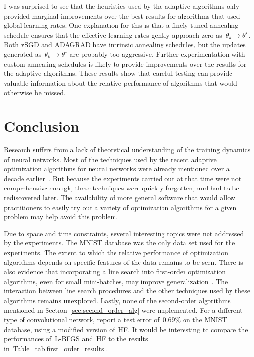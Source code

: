 \documentclass[11pt,a4paper]{article}
\numberwithin{equation}{section}
\begin{document}
I was surprised to see that the heuristics used by the adaptive algorithms only
provided marginal improvements over the best results for algorithms that used
global learning rates. One explanation for this is that a finely-tuned annealing
schedule ensures that the effective learning rates gently approach zero
as~$\theta_k \to \theta^\star$. Both vSGD and ADAGRAD have intrinsic annealing
schedules, but the updates generated as~$\theta_k \to \theta^\star$ are probably
too aggressive. Further experimentation with custom annealing schedules is
likely to provide improvements over the results for the adaptive algorithms.
These results show that careful testing can provide valuable information about
the relative performance of algorithms that would otherwise be missed.

\section{Conclusion}

Research suffers from a lack of theoretical understanding of the training
dynamics of neural networks. Most of the techniques used by the recent adaptive
optimization algorithms for neural networks were already mentioned over a decade
earlier~\citep{lecun-98b}. But because the experiments carried out at that time
were not comprehensive enough, these techniques were quickly forgotten, and had
to be rediscovered later. The availability of more general software that would
allow practitioners to easily try out a variety of optimization algorithms for a
given problem may help avoid this problem.

Due to space and time constraints, several interesting topics were not addressed
by the experiments. The MNIST database was the only data set used for the
experiments. The extent to which the relative performance of optimization
algorithms depends on specific features of the data remains to be seen.  There
is also evidence that incorporating a line search into first-order optimization
algorithms, even for small mini-batches, may improve
generalization~\citep{ngiam2011optimization}. The interaction between line
search procedures and the other techniques used by these algorithms remains
unexplored. Lastly, none of the second-order algorithms mentioned in
Section~\ref{sec:second_order_alg} were implemented. For a different type of
convolutional network, \citet{sutskever2013importance} report a test error
of~$0.69\%$ on the MNIST database, using a modified version of~HF. It would be
interesting to compare the performances of~L-BFGS and~HF to the results
in~Table~\ref{tab:first_order_results}.


\clearpage

\end{document}
